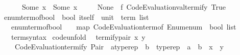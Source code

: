 \begin{isabellebody}
\ \ \ \ \ \ Some\ x{\isacharprime}{\kern0pt}\ {\isasymRightarrow}\ Some\ x{\isacharprime}{\kern0pt}\isanewline
\ \ \ \ {\isacharbar}{\kern0pt}\ None\ {\isasymRightarrow}\ f\ {\isacharparenleft}{\kern0pt}Code{\isacharunderscore}{\kern0pt}Evaluation{\isachardot}{\kern0pt}valtermify\ True{\isacharparenright}{\kern0pt}{\isacharparenright}{\kern0pt}{\isachardoublequoteclose}\isanewline
\isanewline
{}\isamarkupfalse%
\ enum{\isacharunderscore}{\kern0pt}term{\isacharunderscore}{\kern0pt}of{\isacharunderscore}{\kern0pt}bool\ {\isacharcolon}{\kern0pt}{\isacharcolon}{\kern0pt}\ {\isachardoublequoteopen}bool\ itself\ {\isasymRightarrow}\ unit\ {\isasymRightarrow}\ term\ list{\isachardoublequoteclose}\isanewline
\ \ \ {\isachardoublequoteopen}enum{\isacharunderscore}{\kern0pt}term{\isacharunderscore}{\kern0pt}of{\isacharunderscore}{\kern0pt}bool\ {\isacharequal}{\kern0pt}\ {\isacharparenleft}{\kern0pt}{\isasymlambda}{\isacharunderscore}{\kern0pt}\ {\isacharunderscore}{\kern0pt}{\isachardot}{\kern0pt}\ map\ Code{\isacharunderscore}{\kern0pt}Evaluation{\isachardot}{\kern0pt}term{\isacharunderscore}{\kern0pt}of\ {\isacharparenleft}{\kern0pt}Enum{\isachardot}{\kern0pt}enum\ {\isacharcolon}{\kern0pt}{\isacharcolon}{\kern0pt}\ bool\ list{\isacharparenright}{\kern0pt}{\isacharparenright}{\kern0pt}{\isachardoublequoteclose}\isanewline
\isanewline
{}\isamarkupfalse%
%
\isadelimproof
\ %
\endisadelimproof
%
\isatagproof
\isacommand{{\isachardot}{\kern0pt}{\isachardot}{\kern0pt}}\isamarkupfalse%
%
\endisatagproof
{\isafoldproof}%
%
\isadelimproof
%
\endisadelimproof
\isanewline
\isanewline
{}\isamarkupfalse%
\isanewline
\isanewline
{}\isamarkupfalse%
\isanewline
\ \ \ term{\isacharunderscore}{\kern0pt}syntax\isanewline
{}\isanewline
\isanewline
{}\isamarkupfalse%
\ {\isacharbrackleft}{\kern0pt}code{\isacharunderscore}{\kern0pt}unfold{\isacharbrackright}{\kern0pt}{\isacharcolon}{\kern0pt}\isanewline
\ \ {\isachardoublequoteopen}termify{\isacharunderscore}{\kern0pt}pair\ x\ y\ {\isacharequal}{\kern0pt}\isanewline
\ \ \ \ Code{\isacharunderscore}{\kern0pt}Evaluation{\isachardot}{\kern0pt}termify\ {\isacharparenleft}{\kern0pt}Pair\ {\isacharcolon}{\kern0pt}{\isacharcolon}{\kern0pt}\ {\isacharprime}{\kern0pt}a{\isacharcolon}{\kern0pt}{\isacharcolon}{\kern0pt}typerep\ {\isasymRightarrow}\ {\isacharprime}{\kern0pt}b\ {\isacharcolon}{\kern0pt}{\isacharcolon}{\kern0pt}\ typerep\ {\isasymRightarrow}\ {\isacharprime}{\kern0pt}a\ {\isacharasterisk}{\kern0pt}\ {\isacharprime}{\kern0pt}b{\isacharparenright}{\kern0pt}\ {\isacharless}{\kern0pt}{\isasymcdot}{\isachargreater}{\kern0pt}\ x\ {\isacharless}{\kern0pt}{\isasymcdot}{\isachargreater}{\kern0pt}\ y{\isachardoublequoteclose}\isanewline

\end{isabellebody}
